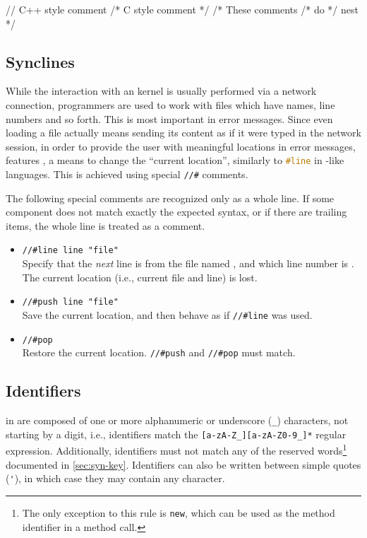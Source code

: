 \begin{urbiscript}
// C++ style comment
/* C style comment */
/* These comments /* do */ nest */
\end{urbiscript}

\subsection{Synclines}
\label{sec:specs:synclines}

While the interaction with an \us kernel is usually performed via a
network connection, programmers are used to work with files which have
names, line numbers and so forth.  This is most important in error
messages.  Since even loading a file actually means sending its
content as if it were typed in the network session, in order to
provide the user with meaningful locations in error messages, \us
features , a means to change the ``current
location'', similarly to \lstinline[language=C]|#line| in \C-like
languages.  This is achieved using special \lstinline|//#| comments.

The following special comments are recognized only as a whole line.
If some component does not match exactly the expected syntax, or if
there are trailing items, the whole line is treated as a comment.
\begin{itemize}
\item \lstinline|//#line line "file"|\\
  Specify that the \emph{next} line is from the file named ,
  and which line number is .  The current location (i.e.,
  current file and line) is lost.

\item \lstinline|//#push line "file"|\\
  Save the current location, and then behave as if \lstinline|//#line|
  was used.

\item \lstinline|//#pop|\\
  Restore the current location.  \lstinline|//#push| and
  \lstinline|//#pop| must match.
\end{itemize}


\subsection{Identifiers}
\label{sec:us-syn-id}

 in \us are composed of one or more alphanumeric or
underscore (\lstinline|_|) characters, not starting by a digit, i.e.,
identifiers match the \lstinline|[a-zA-Z_][a-zA-Z0-9_]*| regular
expression.  Additionally, identifiers must not match any of the \us
reserved words\footnote{
  The only exception to this rule is \lstinline|new|, which can be
  used as the method identifier in a method call.
} documented in \autoref{sec:syn-key}. Identifiers can also be written
between simple quotes (\lstinline|'|), in which case they may contain
any character.

